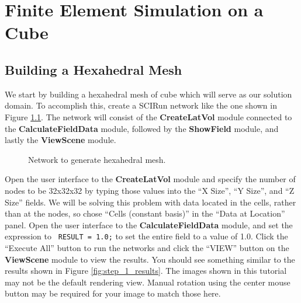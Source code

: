 \documentclass[fleqn,11pt,openany]{book}
\begin{document}
\chapter{Finite Element Simulation on a Cube} \label{sec:cube}

\section{Building a Hexahedral Mesh}

We start by building a hexahedral mesh of cube which will serve as our
solution domain. To accomplish this, create a SCIRun network like the
one shown in Figure \ref{fig:hexMeshNetwork}. The network will consist
of the {\bf CreateLatVol} module connected to the {\bf
CalculateFieldData} module, followed by the {\bf ShowField} module,
and lastly the {\bf ViewScene} module.

\begin{figure}
\caption{Network to generate hexahedral
mesh.}\label{fig:hexMeshNetwork}
\end{figure}

Open the user interface to the {\bf CreateLatVol} module and specify
the number of nodes to be 32x32x32 by typing those values into the ``X
Size'', ``Y Size'', and ``Z Size'' fields. We will be solving this
problem with data located in the cells, rather than at the nodes, so
chose ``Cells (constant basis)'' in the ``Data at Location'' panel.
Open the user interface to
the {\bf CalculateFieldData} module, and set the expression to {\tt
RESULT~=~1.0;} to set the entire field to a value of 1.0. Click the
``Execute All'' button to run the networks and click the ``VIEW''
button on the {\bf ViewScene} module to view the results. You should
see something similar to the results shown in Figure
\ref{fig:step_1_results}. The images shown in this tutorial may not be
the default rendering view. Manual rotation using the center mouse
button may be required for your image to match those here.
\end{document}
